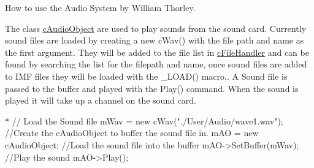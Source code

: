 How to use the Audio System by William Thorley.

The class \hyperlink{classc_audio_object}{cAudioObject} are used to play sounds from the sound card. Currently sound files are loaded by creating a new cWav() with the file path and name as the first argument. They will be added to the file list in \hyperlink{classc_file_handler}{cFileHandler} and can be found by searching the list for the filepath and name, once sound files are added to IMF files they will be loaded with the \_\-LOAD() macro.. A Sound file is passed to the buffer and played with the Play() command. When the sound is played it will take up a channel on the sound card.


\begin{DoxyCode}
  * // Load the Sound file
 mWav = new cWav("./User/Audio/wave1.wav");
 //Create the cAudioObject to buffer the sound file in.
 mAO = new cAudioObject;
 //Load the sound file into the buffer
 mAO->SetBuffer(mWav);
 //Play the sound
 mAO->Play();
\end{DoxyCode}
 